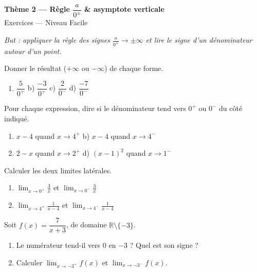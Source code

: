 \documentclass[11pt,a4paper]{article}
\newcommand{\R}{\mathbb{R}}
\begin{document}
\begin{center}
{\Large\bfseries\color{primarydark}Thème 2 — Règle $\dfrac{a}{0^{\pm}}$ \& asymptote verticale}\\[2pt]
{\large\color{primary}Exercices — Niveau Facile}
\end{center}
\vspace{4pt}
{\small\itshape But : appliquer la règle des signes $\frac{a}{0^{\pm}}\to\pm\infty$ et lire le signe
d'un dénominateur autour d'un point.}
\vspace{6pt}

\begin{exercice}
Donner le résultat ($+\infty$ ou $-\infty$) de chaque forme.
\begin{enumerate}[label=\alph*),leftmargin=2em,itemsep=3pt]
  \item $\dfrac{5}{0^{+}}$ \qquad b) $\dfrac{-3}{0^{+}}$ \qquad c) $\dfrac{2}{0^{-}}$ \qquad d) $\dfrac{-7}{0^{-}}$
\end{enumerate}
\end{exercice}

\begin{exercice}
Pour chaque expression, dire si le dénominateur tend vers $0^{+}$ ou $0^{-}$ du côté indiqué.
\begin{enumerate}[label=\alph*),leftmargin=2em,itemsep=3pt]
  \item $x-4$ quand $x\to 4^{+}$ \qquad b) $x-4$ quand $x\to 4^{-}$
  \item $2-x$ quand $x\to 2^{+}$ \qquad d) $(x-1)^2$ quand $x\to 1^{-}$
\end{enumerate}
\end{exercice}

\begin{exercice}
Calculer les deux limites latérales.
\begin{enumerate}[label=\alph*),leftmargin=2em,itemsep=3pt]
  \item $\displaystyle\lim_{x\to 0^{+}}\frac{3}{x}$ \qquad et \qquad $\displaystyle\lim_{x\to 0^{-}}\frac{3}{x}$
  \item $\displaystyle\lim_{x\to 4^{+}}\frac{1}{x-4}$ \qquad et \qquad $\displaystyle\lim_{x\to 4^{-}}\frac{1}{x-4}$
\end{enumerate}
\end{exercice}

\begin{exercice}
Soit $f(x)=\dfrac{7}{x+3}$, de domaine $\R\setminus\{-3\}$.
\begin{enumerate}[label=\alph*),leftmargin=2em,itemsep=3pt]
  \item Le numérateur tend-il vers $0$ en $-3$ ? Quel est son signe ?
  \item Calculer $\displaystyle\lim_{x\to -3^{+}} f(x)$ et $\displaystyle\lim_{x\to -3^{-}} f(x)$.
\end{enumerate}
\end{exercice}
\end{document}
